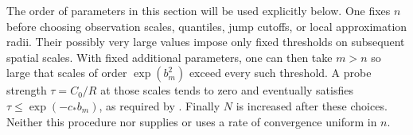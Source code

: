 The order of parameters in this section will be used explicitly
below. One fixes $n$ before choosing observation scales, quantiles,
jump cutoffs, or local approximation radii. Their possibly very
large values impose only fixed thresholds on subsequent spatial
scales. With fixed additional parameters, one can then take $m>n$
so large that scales of order $\exp(b_m^2)$ exceed every such
threshold. A probe strength $\tau=C_0/R$ at those scales tends to
zero and eventually satisfies
$\tau\leq\exp(-c_*b_m)$, as required by
. Finally $N$ is increased after these choices.
Neither this procedure nor  supplies or uses a
rate of convergence uniform in $n$.
